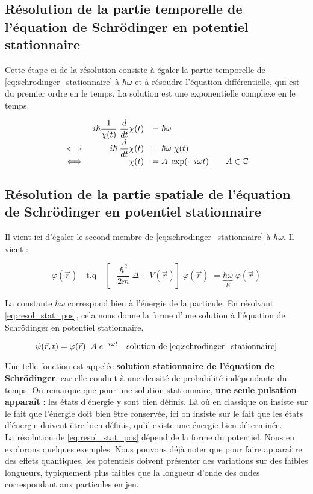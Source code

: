 \documentclass{book}
\begin{document}
\subsection{Résolution de la partie temporelle de l'équation de Schrödinger en potentiel stationnaire}
Cette étape-ci de la résolution consiste à égaler la partie temporelle de \eqref{eq:schrodinger_stationnaire} à $\hbar \omega$ et à résoudre l'équation différentielle, qui est du premier ordre en le temps. La solution est une exponentielle complexe en le temps.

\begin{equation} \label{eq:resol_stat_temps}
\begin{array}{lrl r}
& i\hbar \dfrac{1}{\chi(t)} \; \dfrac{d}{dt} \chi(t) &= \hbar \omega  &\\
\iff& i \hbar \; \dfrac{d}{dt} \chi(t) &= \hbar \omega \;  \chi(t)  &\\
\iff & \chi(t) &= A \; \exp(-i\omega t)  &\quad A \in \mathbb{C}
\end{array}
\end{equation}


\subsection{Résolution de la partie spatiale de l'équation de Schrödinger en potentiel stationnaire}
Il vient ici d'égaler le second membre de \eqref{eq:schrodinger_stationnaire} à $\hbar \omega$. Il vient :

\begin{equation} \label{eq:resol_stat_pos}
\varphi(\vec r) \quad \mathrm{t.q} \quad \left[-\dfrac{\hbar ^2}{2m} \; \Delta + V(\vec r) \right] \; \varphi(\vec r) \; = \underbrace{\hbar	\omega}_E \; \varphi(\vec r)
\end{equation}


La constante $\hbar \omega$ correspond bien à l'énergie de la particule. En résolvant \eqref{eq:resol_stat_pos}, cela nous donne la forme d'une solution à l'équation de Schrödinger en potentiel stationnaire.

\begin{equation}
\psi(\vec r, t) = \varphi(\vec r) \; \;  A \;e^{-i\omega t} \quad \text{solution de \eqref{eq:schrodinger_stationnaire}}
\end{equation}


Une telle fonction est appelée \textbf{solution stationnaire de l'équation de Schrödinger}, car elle conduit à une densité de probabilité indépendante du temps. On remarque que pour une solution stationnaire, \textbf{une seule pulsation apparaît} : les états d'énergie y sont bien définis. Là où en classique on insiste sur le fait que l'énergie doit bien être conservée, ici on insiste sur le fait que les états d'énergie doivent être bien définis, qu'il existe une énergie bien déterminée. \\

La résolution de \eqref{eq:resol_stat_pos} dépend de la forme du potentiel. Nous en explorons quelques exemples. Nous pouvons déjà noter que pour faire apparaître des effets quantiques, les potentiels doivent présenter des variations sur des faibles longueurs, typiquement plus faibles que la longueur d'onde des ondes correspondant aux particules en jeu.
\end{document}
